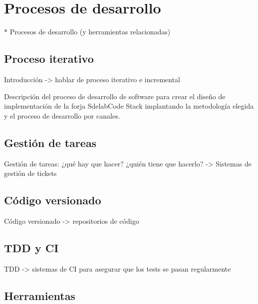 \chapter{Procesos de desarrollo}
\label{chap:procesos-desarrollo}

* Procesos de desarrollo (y herramientas relacionadas)

\section{Proceso iterativo}
\label{sec:proc-iterativo}

\par Introducción -> hablar de proceso iterativo e incremental

\par Descripci\'on del proceso de desarrollo de software para crear el dise\~no de implementaci\'on de la forja SdelabCode Stack implantando la metodolog\'ia elegida y el proceso de desarrollo por canales.


\section{Gestión de tareas}
\label{sec:gestion-tareas}

\par Gestión de tareas: ¿qué hay que hacer? ¿quién tiene que hacerlo? -> Sistemas de gestión de tickets

\section{Código versionado}
\label{sec:codigo-versionado}

\par Código versionado -> repositorios de código


\section{TDD y CI}
\label{sec:tdd-ci}

\par TDD -> sistemas de CI para asegurar que los tests se pasan regularmente


\section{Herramientas}
\label{sec:herramientas}


